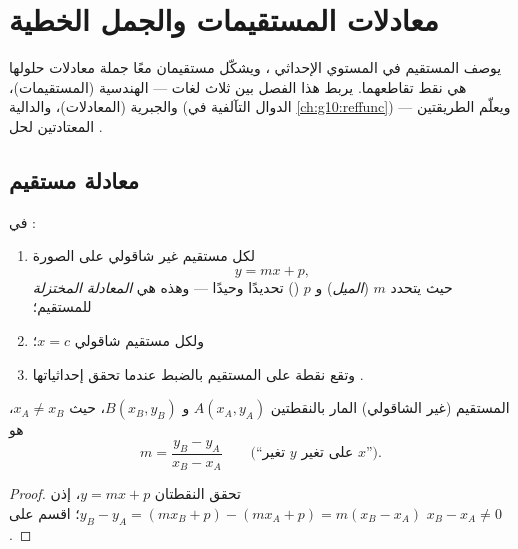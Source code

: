 \chapter{معادلات المستقيمات والجمل الخطية}\label{ch:g10:lines}

يوصف المستقيم في المستوي الإحداثي ، ويشكّل
مستقيمان معًا جملة معادلات حلولها هي نقط
تقاطعهما. يربط هذا الفصل بين ثلاث لغات --- الهندسية
(المستقيمات)، والجبرية (المعادلات)، والدالية (الدوال التآلفية في
\cref{ch:g10:reffunc}) --- ويعلّم الطريقتين المعتادتين لحل
.

\section{معادلة مستقيم}

\begin{theorem}\label{thm:g10:lines:reduced}
في :
\begin{enumerate}
  \item لكل مستقيم غير شاقولي  على الصورة
        \[
        y = mx + p ,
        \]
        حيث يتحدد $m$ (\emph{الميل}) و $p$
        (\emph{}) تحديدًا وحيدًا --- وهذه هي
        \emph{المعادلة المختزلة} للمستقيم؛
  \item ولكل مستقيم شاقولي  $x = c$؛
  \item وتقع نقطة على المستقيم بالضبط عندما تحقق إحداثياتها
        .
\end{enumerate}
\end{theorem}
\admitted

\begin{proposition}\label{prop:g10:lines:slope}
 المستقيم (غير الشاقولي) المار بالنقطتين $A(x_A, y_A)$ و
$B(x_B, y_B)$، حيث $x_A \neq x_B$، هو
\[
m = \frac{y_B - y_A}{x_B - x_A}
\qquad
\text{(``تغير $y$ على تغير $x$'').}
\]
\end{proposition}

\begin{proof}
تحقق النقطتان $y = mx + p$، إذن $y_B - y_A = (mx_B + p) - (mx_A + p)
= m(x_B - x_A)$؛ اقسم على $x_B - x_A \neq 0$.
\end{proof}

